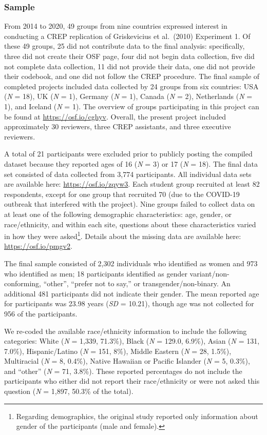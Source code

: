\documentclass[
]{article}
\begin{document}
\subsubsection{Sample}\label{sample}

From 2014 to 2020, 49 groups from nine countries expressed interest in
conducting a CREP replication of Griskevicius et al.~(2010) Experiment
1. Of these 49 groups, 25 did not contribute data to the final analysis:
specifically, three did not create their OSF page, four did not begin
data collection, five did not complete data collection, 11 did not
provide their data, one did not provide their codebook, and one did not
follow the CREP procedure. The final sample of completed projects
included data collected by 24 groups from six countries: USA (\emph{N} =
18), UK (\emph{N} = 1), Germany (\emph{N} = 1), Canada (\emph{N} = 2),
Netherlands (\emph{N} = 1), and Iceland (\emph{N} = 1). The overview of
groups participating in this project can be found at
\url{https://osf.io/cghyv}. Overall, the present project included
approximately 30 reviewers, three CREP assistants, and three executive
reviewers.

A total of 21 participants were excluded prior to publicly posting the
compiled dataset because they reported ages of 16 (\emph{N} = 3) or 17
(\emph{N} = 18). The final data set consisted of data collected from
3,774 participants. All individual data sets are available here:
\url{https://osf.io/zqyw3}. Each student group recruited at least 82
respondents, except for one group that recruited 70 (due to the COVID-19
outbreak that interfered with the project). Nine groups failed to
collect data on at least one of the following demographic
characteristics: age, gender, or race/ethnicity, and within each site,
questions about these characteristics varied in how they were
asked\footnote{Regarding demographics, the original study reported only
  information about gender of the participants (male and female).}.
Details about the missing data are available here:
\url{https://osf.io/pmgv2}.

The final sample consisted of 2,302 individuals who identified as women
and 973 who identified as men; 18 participants identified as gender
variant/non-conforming, ``other'', ``prefer not to say,'' or
transgender/non-binary. An additional 481 participants did not indicate
their gender. The mean reported age for participants was 23.98 years
(\emph{SD} = 10.21), though age was not collected for 956 of the
participants.

We re-coded the available race/ethnicity information to include the
following categories: White (\emph{N} = 1,339, 71.3\%), Black (\emph{N}
= 129.0, 6.9\%), Asian (\emph{N} = 131, 7.0\%), Hispanic/Latino
(\emph{N} = 151, 8\%), Middle Eastern (\emph{N} = 28, 1.5\%),
Multiracial (\emph{N} = 8, 0.4\%), Native Hawaiian or Pacific Islander
(\emph{N} = 5, 0.3\%), and ``other'' (\emph{N} = 71, 3.8\%). These
reported percentages do not include the participants who either did not
report their race/ethnicity or were not asked this question (\emph{N} =
1,897, 50.3\% of the total).
\end{document}
